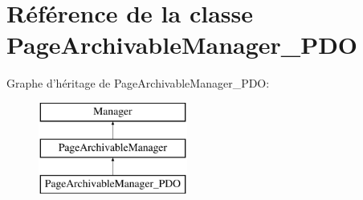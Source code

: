 \hypertarget{class_library_1_1_models_1_1_page_archivable_manager___p_d_o}{\section{Référence de la classe Page\+Archivable\+Manager\+\_\+\+P\+D\+O}
\label{class_library_1_1_models_1_1_page_archivable_manager___p_d_o}
}
Graphe d'héritage de Page\+Archivable\+Manager\+\_\+\+P\+D\+O\+:\begin{figure}[H]
\begin{center}
\leavevmode
\includegraphics[height=3.000000cm]{class_library_1_1_models_1_1_page_archivable_manager___p_d_o}
\end{center}
\end{figure}
